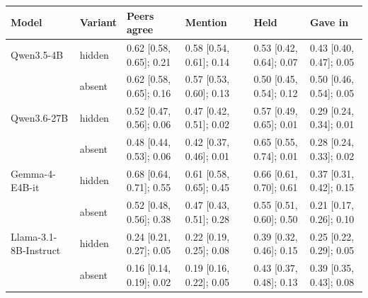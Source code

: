 \begin{tabular}{llllll}
\toprule
Model & Variant & Peers agree & Mention & Held & Gave in \\
\midrule
Qwen3.5-4B & hidden & 0.62 [0.58, 0.65]; 0.21 & 0.58 [0.54, 0.61]; 0.14 & 0.53 [0.42, 0.64]; 0.07 & 0.43 [0.40, 0.47]; 0.05 \\
 & absent & 0.62 [0.58, 0.65]; 0.16 & 0.57 [0.53, 0.60]; 0.13 & 0.50 [0.45, 0.54]; 0.12 & 0.50 [0.46, 0.54]; 0.05 \\
\midrule
Qwen3.6-27B & hidden & 0.52 [0.47, 0.56]; 0.06 & 0.47 [0.42, 0.51]; 0.02 & 0.57 [0.49, 0.65]; 0.01 & 0.29 [0.24, 0.34]; 0.01 \\
 & absent & 0.48 [0.44, 0.53]; 0.06 & 0.42 [0.37, 0.46]; 0.01 & 0.65 [0.55, 0.74]; 0.01 & 0.28 [0.24, 0.33]; 0.02 \\
\midrule
Gemma-4-E4B-it & hidden & 0.68 [0.64, 0.71]; 0.55 & 0.61 [0.58, 0.65]; 0.45 & 0.66 [0.61, 0.70]; 0.61 & 0.37 [0.31, 0.42]; 0.15 \\
 & absent & 0.52 [0.48, 0.56]; 0.38 & 0.47 [0.43, 0.51]; 0.28 & 0.55 [0.51, 0.60]; 0.50 & 0.21 [0.17, 0.26]; 0.10 \\
\midrule
Llama-3.1-8B-Instruct & hidden & 0.24 [0.21, 0.27]; 0.05 & 0.22 [0.19, 0.25]; 0.08 & 0.39 [0.32, 0.46]; 0.15 & 0.25 [0.22, 0.29]; 0.05 \\
 & absent & 0.16 [0.14, 0.19]; 0.02 & 0.19 [0.16, 0.22]; 0.05 & 0.43 [0.37, 0.48]; 0.13 & 0.39 [0.35, 0.43]; 0.08 \\
\bottomrule
\end{tabular}
